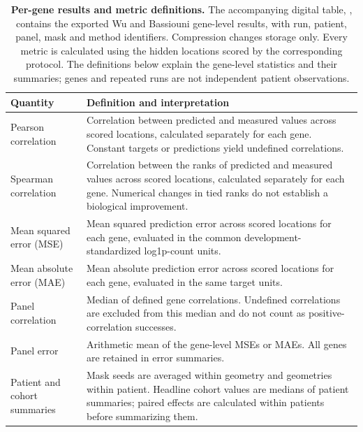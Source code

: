 \begin{table}[htbp]
\caption{\textbf{Per-gene results and metric definitions.} The accompanying digital table, \protect{}, contains the exported Wu and Bassiouni gene-level results, with run, patient, panel, mask and method identifiers. Compression changes storage only. Every metric is calculated using the hidden locations scored by the corresponding protocol. The definitions below explain the gene-level statistics and their summaries; genes and repeated runs are not independent patient observations.}
\label{tab:s3}
\centering\small
\begin{tabularx}{\textwidth}{>{\RaggedRight\arraybackslash}p{}Y}\toprule
Quantity & Definition and interpretation\\\midrule
Pearson correlation & Correlation between predicted and measured values across scored locations, calculated separately for each gene. Constant targets or predictions yield undefined correlations.\\
Spearman correlation & Correlation between the ranks of predicted and measured values across scored locations, calculated separately for each gene. Numerical changes in tied ranks do not establish a biological improvement.\\
Mean squared error (MSE) & Mean squared prediction error across scored locations for each gene, evaluated in the common development-standardized log1p-count units.\\
Mean absolute error (MAE) & Mean absolute prediction error across scored locations for each gene, evaluated in the same target units.\\
Panel correlation & Median of defined gene correlations. Undefined correlations are excluded from this median and do not count as positive-correlation successes.\\
Panel error & Arithmetic mean of the gene-level MSEs or MAEs. All genes are retained in error summaries.\\
Patient and cohort summaries & Mask seeds are averaged within geometry and geometries within patient. Headline cohort values are medians of patient summaries; paired effects are calculated within patients before summarizing them.\\
\bottomrule\end{tabularx}
\end{table}
